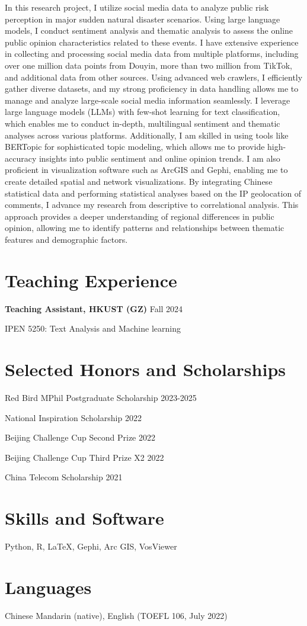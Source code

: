 \documentclass[letterpaper, 11pt]{article}
\begin{document}
In this research project, I utilize social media data to analyze public risk perception in major sudden natural disaster scenarios. Using large language models, I conduct sentiment analysis and thematic analysis to assess the online public opinion characteristics related to these events. I have extensive experience in collecting and processing social media data from multiple platforms, including over one million data points from Douyin, more than two million from TikTok, and additional data from other sources. Using advanced web crawlers, I efficiently gather diverse datasets, and my strong proficiency in data handling allows me to manage and analyze large-scale social media information seamlessly. I leverage large language models (LLMs) with few-shot learning for text classification, which enables me to conduct in-depth, multilingual sentiment and thematic analyses across various platforms. Additionally, I am skilled in using tools like BERTopic for sophisticated topic modeling, which allows me to provide high-accuracy insights into public sentiment and online opinion trends. I am also proficient in visualization software such as ArcGIS and Gephi, enabling me to create detailed spatial and network visualizations. By integrating Chinese statistical data and performing statistical analyses based on the IP geolocation of comments, I advance my research from descriptive to correlational analysis. This approach provides a deeper understanding of regional differences in public opinion, allowing me to identify patterns and relationships between thematic features and demographic factors.

\section{Teaching Experience}
\textbf{Teaching Assistant, HKUST (GZ)} \hfill Fall 2024

IPEN 5250: Text Analysis and Machine learning

\section{Selected Honors and Scholarships}
Red Bird MPhil Postgraduate Scholarship \hfill 2023-2025

National Inspiration Scholarship \hfill 2022

Beijing Challenge Cup Second Prize \hfill 2022

Beijing Challenge Cup Third Prize X2 \hfill 2022

China Telecom Scholarship \hfill 2021

\section{Skills and Software}
Python, R, LaTeX, Gephi, Arc GIS, VosViewer

\section{Languages}
Chinese Mandarin (native), English (TOEFL 106, July 2022)
\end{document}
